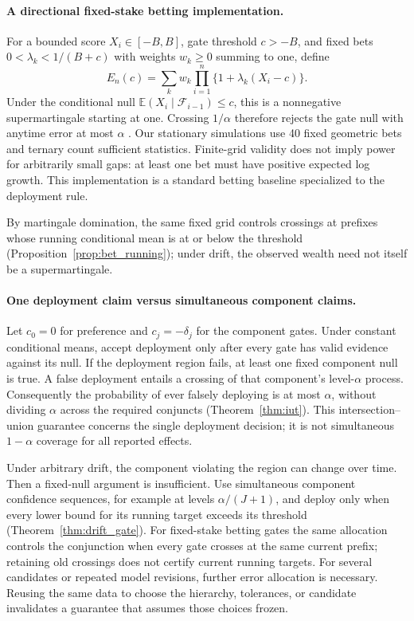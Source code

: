 \documentclass[11pt,letterpaper]{article}
\newcommand{\E}{\mathbb E}
\begin{document}
\paragraph{A directional fixed-stake betting implementation.}
For a bounded score $X_i\in[-B,B]$, gate threshold $c>-B$, and fixed
bets $0<\lambda_k<1/(B+c)$ with weights $w_k\geq0$ summing to one,
define
\begin{equation}
 E_n(c)=\sum_k w_k\prod_{i=1}^n\{1+\lambda_k(X_i-c)\}.
 \label{eq:main_bet}
\end{equation}
Under the conditional null $\E(X_i\mid\mathcal F_{i-1})\leq c$, this
is a nonnegative supermartingale starting at one. Crossing $1/\alpha$
therefore rejects the gate null with anytime error at most $\alpha$
\citep{waudbysmith2024betting}. Our stationary simulations use 40 fixed
geometric bets and ternary count sufficient statistics. Finite-grid
validity does not imply power for arbitrarily small gaps: at least one
bet must have positive expected log growth. This implementation is a
standard betting baseline specialized to the deployment rule.

By martingale domination, the same fixed grid controls crossings at
prefixes whose running conditional mean is at or below the threshold
(Proposition~\ref{prop:bet_running}); under drift, the observed wealth
need not itself be a supermartingale.

\paragraph{One deployment claim versus simultaneous component claims.}
Let $c_0=0$ for preference and $c_j=-\delta_j$ for the component gates.
Under constant conditional means, accept deployment only after every gate
has valid evidence against its null. If the deployment region fails,
at least one fixed component null is true. A false deployment entails a
crossing of that component's level-$\alpha$ process. Consequently the
probability of ever falsely deploying is at most $\alpha$, without
dividing $\alpha$ across the required conjuncts
(Theorem~\ref{thm:iut}). This intersection--union guarantee concerns the
single deployment decision; it is not simultaneous $1-\alpha$ coverage
for all reported effects.

Under arbitrary drift, the component violating the region can change
over time. Then a fixed-null argument is insufficient. Use simultaneous
component confidence sequences, for example at levels
$\alpha/(J+1)$, and deploy only when every lower bound for its running
target exceeds its threshold (Theorem~\ref{thm:drift_gate}). For
fixed-stake betting gates the same allocation controls the conjunction
when every gate crosses at the same current prefix; retaining old
crossings does not certify current running targets. For several
candidates or repeated model revisions, further error allocation is
necessary. Reusing the same data to choose the hierarchy, tolerances,
or candidate invalidates a guarantee that assumes those choices frozen.
\end{document}
